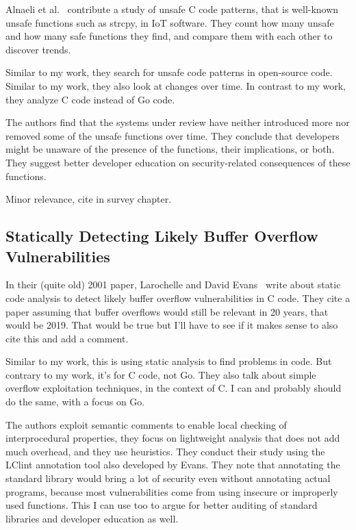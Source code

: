Alnaeli et al.~\cite{alnaeli2017} contribute a study of unsafe C code patterns, that is well-known unsafe
functions such as strcpy, in IoT software.
They count how many unsafe and how many safe functions they find, and compare them with each other to discover trends.

Similar to my work, they search for unsafe code patterns in open-source code.
Similar to my work, they also look at changes over time.
In contrast to my work, they analyze C code instead of Go code.

The authors find that the systems under review have neither introduced more nor removed some of the unsafe functions
over time.
They conclude that developers might be unaware of the presence of the functions, their implications, or both.
They suggest better developer education on security-related consequences of these functions.

Minor relevance, cite in survey chapter.



\subsection{Statically Detecting Likely Buffer Overflow Vulnerabilities}
\label{subsec:statically-detecting-likely-buffer-overflow-vulnerabilities}

In their (quite old) 2001 paper, Larochelle and David Evans~\cite{larochelle2001} write about static code analysis to
detect likely buffer overflow vulnerabilities in C code.
They cite a paper assuming that buffer overflows would still be relevant in 20 years, that would be 2019.
That would be true but I'll have to see if it makes sense to also cite this and add a comment.

Similar to my work, this is using static analysis to find problems in code.
But contrary to my work, it's for C code, not Go.
They also talk about simple overflow exploitation techniques, in the context of C\@.
I can and probably should do the same, with a focus on Go.

The authors exploit semantic comments to enable local checking of interprocedural properties, they focus on lightweight
analysis that does not add much overhead, and they use heuristics.
They conduct their study using the LClint annotation tool also developed by Evans.
They note that annotating the standard library would bring a lot of security even without annotating actual programs,
because most vulnerabilities come from using insecure or improperly used functions.
This I can use too to argue for better auditing of standard libraries and developer education as well.


